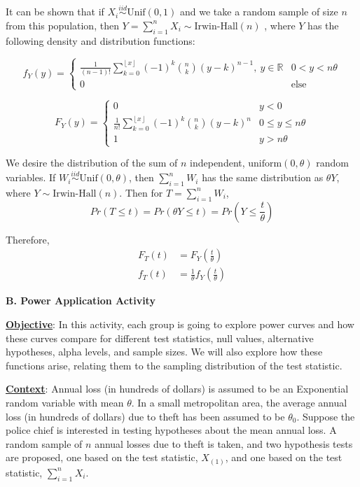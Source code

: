 \documentclass{TISE}
\begin{document}
It can be shown that if $X_i \stackrel{iid}{\sim} \text{Unif}(0, 1)$ and we take a random sample of size $n$ from this population, then $Y = \sum_{i=1}^n X_i \sim \text{Irwin-Hall}(n)$ \citep{marengo2017}, where $Y$ has the following density and distribution functions:

\[
f_Y(y) = \begin{cases}
\frac{1}{(n-1)!} \sum_{k = 0}^{\left \lfloor{x}\right \rfloor} (-1)^k \binom{n}{k}(y-k)^{n-1}, \ y \in \mathbb{R} & 0 < y < n\theta \\
0 & \text{else}
\end{cases} 
\]

\[
F_Y(y) = \begin{cases}
0 & y < 0 \\
\frac{1}{n!} \sum_{k = 0}^{\left \lfloor{x}\right \rfloor} (-1)^k \binom{n}{k}(y-k)^{n} & 0 \leq y \leq n\theta \\
1 & y > n\theta 
\end{cases}
\]

We desire the distribution of the sum of $n$ independent, $\text{uniform}(0, \theta)$ random variables. If $W_i \stackrel{iid}{\sim} \text{Unif}(0, \theta)$, then $\sum_{i=1}^n W_i$ has the same distribution as $\theta Y$, where $Y \sim \text{Irwin-Hall}(n)$. Then for $T = \sum_{i=1}^n W_i$, 
\[
Pr(T \leq t) = Pr(\theta Y \leq t) = Pr\left(Y \leq \frac{t}{\theta}\right)
\]

Therefore, 
\[
\begin{split}
F_T(t) &= F_Y\left(\frac{t}{\theta} \right) \\
f_T(t) &= \frac{1}{\theta} f_Y\left(\frac{t}{\theta}\right)
\end{split}
\]

\newpage

\begin{center}
	\textbf{\large B. Power Application Activity}
\end{center}

\textbf{\underline{Objective}}: In this activity, each group is going to explore power curves and how these curves compare for different test statistics, null values, alternative hypotheses, alpha levels, and sample sizes. We will also explore how these functions arise, relating them to the sampling distribution of the test statistic.

\textbf{\underline{Context}}: Annual loss (in hundreds of dollars) is assumed to be an Exponential random variable with mean $\theta$. In a small metropolitan area, the average annual loss (in hundreds of dollars) due to theft has been assumed to be $\theta_0$. Suppose the police chief is interested in testing hypotheses about the mean annual loss. A random sample of $n$ annual losses due to theft is taken, and two hypothesis tests are proposed, one based on the test statistic, $X_{(1)}$, and one based on the test statistic, $\sum_{i=1}^n X_i$.  
\end{document}
